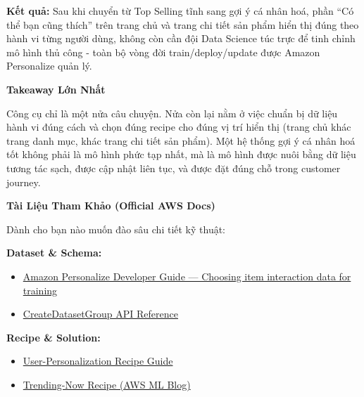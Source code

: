 \textbf{Kết quả:} Sau khi chuyển từ Top Selling tĩnh sang gợi ý cá nhân
hoá, phần ``Có thể bạn cũng thích'' trên trang chủ và trang chi tiết sản
phẩm hiển thị đúng theo hành vi từng người dùng, không còn cần đội Data
Science túc trực để tinh chỉnh mô hình thủ công - toàn bộ vòng đời
train/deploy/update được Amazon Personalize quản lý.

\vspace{0.5em}\noindent\textbf{Takeaway Lớn Nhất}\par

Công cụ chỉ là một nửa câu chuyện. Nửa còn lại nằm ở việc chuẩn bị dữ
liệu hành vi đúng cách và chọn đúng recipe cho đúng vị trí hiển thị
(trang chủ khác trang danh mục, khác trang chi tiết sản phẩm). Một hệ
thống gợi ý cá nhân hoá tốt không phải là mô hình phức tạp nhất, mà là
mô hình được nuôi bằng dữ liệu tương tác sạch, được cập nhật liên tục,
và được đặt đúng chỗ trong customer journey.

\vspace{0.5em}\noindent\textbf{Tài Liệu Tham Khảo (Official AWS
Docs)}\par

Dành cho bạn nào muốn đào sâu chi tiết kỹ thuật:

\vspace{0.5em}\noindent\textbf{Dataset \& Schema:}\par

\begin{itemize}
\tightlist
\item
  \href{https://docs.aws.amazon.com/personalize/latest/dg/event-values-types.html}{Amazon
  Personalize Developer Guide --- Choosing item interaction data for
  training}
\item
  \href{https://docs.aws.amazon.com/personalize/latest/dg/API_CreateDatasetGroup.html}{CreateDatasetGroup
  API Reference}
\end{itemize}

\vspace{0.5em}\noindent\textbf{Recipe \& Solution:}\par

\begin{itemize}
\tightlist
\item
  \href{https://docs.aws.amazon.com/personalize/latest/dg/native-recipe-new-item-USER_PERSONALIZATION.html}{User-Personalization
  Recipe Guide}
\item
  \href{https://aws.amazon.com/blogs/machine-learning/recommend-top-trending-items-to-your-users-using-the-new-amazon-personalize-recipe/}{Trending-Now
  Recipe (AWS ML Blog)}
\end{itemize}

